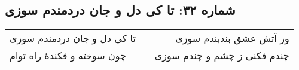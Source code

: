 \begin{center}
\section*{شماره ۳۲: تا کی دل و جان دردمندم سوزی}
\label{sec:032}
\begin{longtable}{l p{0.5cm} r}
تا کی دل و جان دردمندم سوزی
&&
وز آتش عشق بندبندم سوزی
\\
چون سوخته و فکندهٔ راه توام
&&
چندم فکنی ز چشم و چندم سوزی
\\
\end{longtable}
\end{center}
